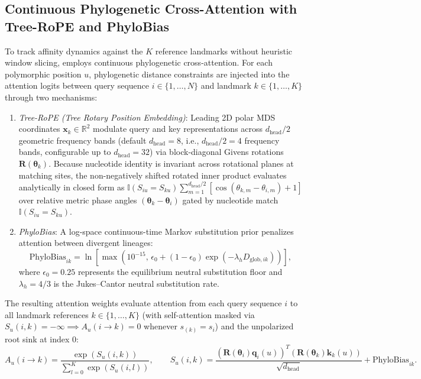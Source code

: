 \subsection{Continuous Phylogenetic Cross-Attention with Tree-RoPE and PhyloBias}
To track affinity dynamics against the $K$ reference landmarks without heuristic window slicing, \RhizAeon employs continuous phylogenetic cross-attention.
For each polymorphic position $u$, phylogenetic distance constraints are injected into the attention logits between query sequence $i \in \{1, \dots, N\}$ and landmark $k \in \{1, \dots, K\}$ through two mechanisms:
\begin{enumerate}
    \item \emph{Tree-RoPE (Tree Rotary Position Embedding)}: Leading 2D polar MDS coordinates $\mathbf{x}_k \in \mathbb{R}^2$ modulate query and key representations across $d_{\mathrm{head}}/2$ geometric frequency bands (default $d_{\mathrm{head}} = 8$, i.e., $d_{\mathrm{head}}/2 = 4$ frequency bands, configurable up to $d_{\mathrm{head}} = 32$) via block-diagonal Givens rotations $\mathbf{R}(\bm{\theta}_k)$. Because nucleotide identity is invariant across rotational planes at matching sites, the non-negatively shifted rotated inner product evaluates analytically in closed form as $\mathbb{I}(S_{iu} = S_{ku}) \sum_{m=1}^{d_{\mathrm{head}}/2} [\cos(\theta_{k,m} - \theta_{i,m}) + 1]$ over relative metric phase angles $(\bm{\theta}_k - \bm{\theta}_i)$ gated by nucleotide match $\mathbb{I}(S_{iu} = S_{ku})$.
    \item \emph{PhyloBias}: A log-space continuous-time Markov substitution prior penalizes attention between divergent lineages:
    \begin{equation}
    \mathrm{PhyloBias}_{ik} = \ln\left[\max\left(10^{-15}, \, \epsilon_0 + (1 - \epsilon_0)\exp(-\lambda_h D_{\mathrm{glob}, ik})\right)\right],
    \end{equation}
    where $\epsilon_0 = 0.25$ represents the equilibrium neutral substitution floor and $\lambda_h = 4/3$ is the Jukes--Cantor neutral substitution rate.
\end{enumerate}
The resulting attention weights evaluate attention from each query sequence $i$ to all landmark references $k \in \{1, \dots, K\}$ (with self-attention masked via $S_u(i, k) = -\infty \implies A_u(i \to k) = 0$ whenever $s_{(k)} = s_i$) and the unpolarized root sink at index $0$:
\begin{equation}
A_u(i \to k) = \frac{\exp\left(S_u(i, k)\right)}{\sum_{l=0}^K \exp\left(S_u(i, l)\right)}, \qquad S_u(i, k) = \frac{(\mathbf{R}(\bm{\theta}_i) \mathbf{q}_i(u))^T (\mathbf{R}(\bm{\theta}_k) \mathbf{k}_k(u))}{\sqrt{d_{\mathrm{head}}}} + \mathrm{PhyloBias}_{ik}.
\end{equation}

